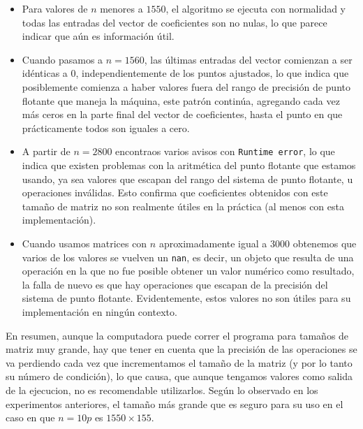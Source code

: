 \documentclass{article}
\begin{document}
\begin{enumerate}
    \begin{itemize}
        \item Para valores de $n$ menores a $1550$, el algoritmo se ejecuta con normalidad y todas las entradas
        del vector de coeficientes son no nulas, lo que parece indicar que aún es información útil.
        \item Cuando pasamos a $n=1560$, las últimas entradas del vector comienzan a ser idénticas a 0, independientemente
        de los puntos ajustados, lo que indica que posiblemente comienza a haber valores fuera del rango de precisión de
        punto flotante que maneja la máquina, este patrón continúa, agregando cada vez más ceros en la parte final
        del vector de coeficientes, hasta el punto en que prácticamente todos son iguales a cero.
        \item A partir de $n=2800$ encontraos varios avisos con \texttt{Runtime error}, lo que indica que existen
        problemas con la aritmética del punto flotante que estamos usando, ya sea valores que escapan del rango del
        sistema de punto flotante, u operaciones inválidas. Esto confirma que coeficientes obtenidos con este tamaño
        de matriz no son realmente útiles en la práctica (al menos con esta implementación).
        \item Cuando usamos matrices con $n$ aproximadamente igual a $3000$ obtenemos que varios de los valores
        se vuelven un \texttt{nan}, es decir, un objeto que resulta de una operación en la que no fue posible 
        obtener un valor numérico como resultado, la falla de nuevo es que hay operaciones que escapan de la precisión
        del sistema de punto flotante. Evidentemente, estos valores no son útiles para su implementación en ningún contexto.
    \end{itemize}

    En resumen, aunque la computadora puede correr el programa para tamaños de matriz muy grande, hay que tener en
    cuenta que la precisión de las operaciones se va perdiendo cada vez que incrementamos el tamaño de la matriz (y 
    por lo tanto su número de condición), lo que causa, que aunque tengamos valores como salida de la ejecucion, no es
    recomendable utilizarlos. Según lo observado en los experimentos anteriores, el tamaño más grande que es seguro 
    para su uso en el caso en que $n = 10p$ es $1550\times155$.
   
\end{enumerate}




 
\end{document}

